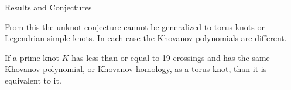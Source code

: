 \documentclass{beamer}
\begin{document}
    \begin{frame}{Results and Conjectures}
        \begin{table}
            \centering
            \caption{Knots whose Jones polynomial matches that of a Torus Knot}
        \end{table}
        From this the unknot conjecture cannot be generalized to torus knots
        or Legendrian simple knots. In each case the Khovanov polynomials
        are different.
        \begin{theorem}
            If a prime knot $K$ has less than or equal to 19 crossings and has
            the same Khovanov polynomial, or Khovanov homology, as a torus
            knot, than it is equivalent to it.
        \end{theorem}
    \end{frame}
\end{document}
